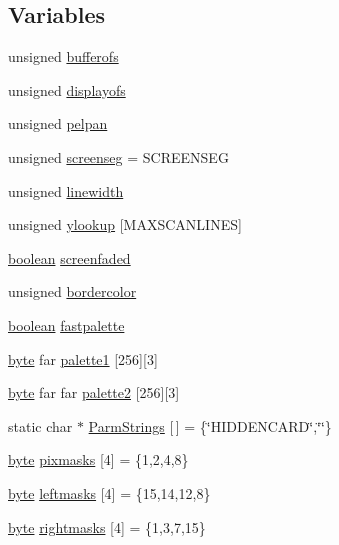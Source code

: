 \subsection*{Variables}
\begin{DoxyCompactItemize}
\item 
unsigned \hyperlink{ID__VL_8C_a95b7c90690730f0b09409f1fb8ef3730}{bufferofs}
\item 
unsigned \hyperlink{ID__VL_8C_ae69449df2121a068cc86de491d7b5956}{displayofs}
\item 
unsigned \hyperlink{ID__VL_8C_a868e53c86d5ef1ddae46b80290a36cd8}{pelpan}
\item 
unsigned \hyperlink{ID__VL_8C_af6fb80e1232b0b5c33e4174a5b7c7985}{screenseg} = SCREENSEG
\item 
unsigned \hyperlink{ID__VL_8C_a4290871866270ef6854fb238a3c8698d}{linewidth}
\item 
unsigned \hyperlink{ID__VL_8C_ab3bdd072ceebbac1d50e74d7c34e9c4a}{ylookup} \mbox{[}MAXSCANLINES\mbox{]}
\item 
\hyperlink{ID__HEAD_8H_a7c6368b321bd9acd0149b030bb8275ed}{boolean} \hyperlink{ID__VL_8C_a81e1545cb2fb150263b44e54eee49451}{screenfaded}
\item 
unsigned \hyperlink{ID__VL_8C_a7d243f7a427ebc7df3533c0cd5760971}{bordercolor}
\item 
\hyperlink{ID__HEAD_8H_a7c6368b321bd9acd0149b030bb8275ed}{boolean} \hyperlink{ID__VL_8C_a675e190adb49e5f2beb6eac8c743e5df}{fastpalette}
\item 
\hyperlink{ID__HEAD_8H_a0c8186d9b9b7880309c27230bbb5e69d}{byte} far \hyperlink{ID__VL_8C_a6b76f235786a33e3e5633337d4040a8e}{palette1} \mbox{[}256\mbox{]}\mbox{[}3\mbox{]}
\item 
\hyperlink{ID__HEAD_8H_a0c8186d9b9b7880309c27230bbb5e69d}{byte} far far \hyperlink{ID__VL_8C_ab69c3ce9f0621a6327c2be3696acb729}{palette2} \mbox{[}256\mbox{]}\mbox{[}3\mbox{]}
\item 
static char $\ast$ \hyperlink{ID__VL_8C_af8599e1c1fbb3afabbdaa22e7c4a94b0}{ParmStrings} \mbox{[}$\,$\mbox{]} = \{\char`\"{}HIDDENCARD\char`\"{},\char`\"{}\char`\"{}\}
\item 
\hyperlink{ID__HEAD_8H_a0c8186d9b9b7880309c27230bbb5e69d}{byte} \hyperlink{ID__VL_8C_afff3c766a9857f86d033f67419f5db75}{pixmasks} \mbox{[}4\mbox{]} = \{1,2,4,8\}
\item 
\hyperlink{ID__HEAD_8H_a0c8186d9b9b7880309c27230bbb5e69d}{byte} \hyperlink{ID__VL_8C_aee788d5b07d9018f62d16a6a04bada6c}{leftmasks} \mbox{[}4\mbox{]} = \{15,14,12,8\}
\item 
\hyperlink{ID__HEAD_8H_a0c8186d9b9b7880309c27230bbb5e69d}{byte} \hyperlink{ID__VL_8C_adbfff86f9416c48fdb30a8fd703446ae}{rightmasks} \mbox{[}4\mbox{]} = \{1,3,7,15\}
\end{DoxyCompactItemize}


